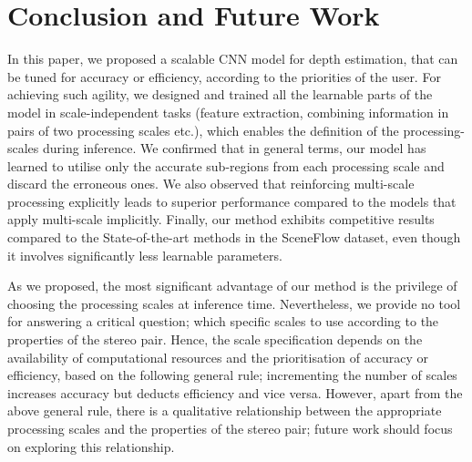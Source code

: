 \documentclass[runningheads]{llncs}
\begin{document}
\section{Conclusion and Future Work}

In this paper, we proposed a scalable CNN model for depth estimation, that can be tuned for accuracy or efficiency, according to the priorities of the user. For achieving such agility, we designed and trained all the learnable parts of the model in scale-independent tasks (feature extraction, combining information in pairs of two processing scales etc.), which enables the definition of the processing-scales during inference. We confirmed that in general terms, our model has learned to utilise only the accurate sub-regions from each processing scale and discard the erroneous ones. We also observed that reinforcing multi-scale processing explicitly leads to superior performance compared to the models that apply multi-scale implicitly. Finally, our method exhibits competitive results compared to the State-of-the-art methods in the SceneFlow dataset, even though it involves significantly less learnable parameters.

As we proposed, the most significant advantage of our method is the privilege of choosing the processing scales at inference time.  Nevertheless, we provide no tool for answering a critical question; which specific scales to use according to the properties of the stereo pair. Hence, the scale specification depends on the availability of computational resources and the prioritisation of accuracy or efficiency, based on the following general rule; incrementing the number of scales increases accuracy but deducts efficiency and vice versa. However, apart from the above general rule, there is a qualitative relationship between the appropriate processing scales and the properties of the stereo pair; future work should focus on exploring this relationship.



\end{document}
